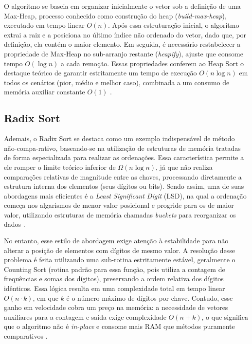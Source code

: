 \documentclass[12pt,a4paper]{article}
\begin{document}
O algoritmo se baseia em organizar inicialmente o vetor sob a definição de uma Max-Heap, processo conhecido como construção do heap (\textit{build-max-heap}), executado em tempo linear $O(n)$. Após essa estruturação inicial, o algoritmo extrai a raiz e a posiciona no último índice não ordenado do vetor, dado que, por definição, ela contém o maior elemento. Em seguida, é necessário restabelecer a propriedade de Max-Heap no sub-arranjo restante (\textit{heapify}), ajuste que consome tempo $O(\log n)$ a cada remoção. Essas propriedades conferem ao Heap Sort o destaque teórico de garantir estritamente um tempo de execução $O(n \log n)$ em todos os cenários (pior, médio e melhor caso), combinada a um consumo de memória auxiliar constante $O(1)$ \cite{sedgewick2011}.

\subsection{Radix Sort}
Ademais, o Radix Sort se destaca como um exemplo indispensável de método não-compa-rativo, baseando-se na utilização de estruturas de memória tratadas de forma especializada para realizar as ordenações. Essa característica permite a ele romper o limite teórico inferior de $\Omega(n \log n)$, já que não realiza comparações relativas de magnitude entre as chaves, processando diretamente a estrutura interna dos elementos (seus dígitos ou bits). Sendo assim, uma de suas abordagens mais eficientes é a \textit{Least Significant Digit} (LSD), na qual a ordenação começa nos algarismos de menor valor posicional e progride para os de maior valor, utilizando estruturas de memória chamadas \textit{buckets} para reorganizar os dados \cite{cormen2012}.

No entanto, esse estilo de abordagem exige atenção à estabilidade para não alterar a posição de elementos com dígitos de mesmo valor. A resolução desse problema é feita utilizando uma sub-rotina estritamente estável, geralmente o Counting Sort (rotina padrão para essa função, pois utiliza a contagem de frequências e somas dos dígitos), preservando a ordem relativa dos dígitos idênticos. Essa lógica resulta em uma complexidade total em tempo linear $O(n \cdot k)$, em que $k$ é o número máximo de dígitos por chave. Contudo, esse ganho em velocidade cobra um preço na memória: a necessidade de vetores auxiliares para a contagem e saída exige complexidade $O(n + k)$, o que significa que o algoritmo não é \textit{in-place} e consome mais RAM que métodos puramente comparativos \cite{sedgewick2011}.
\end{document}
